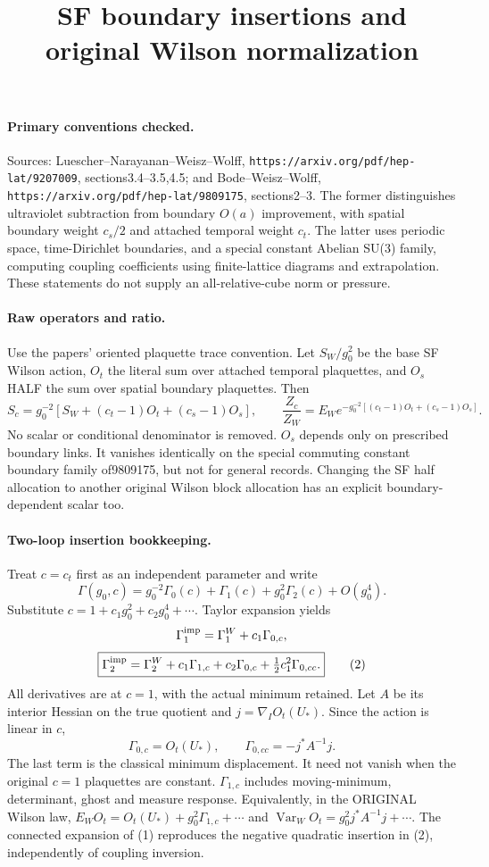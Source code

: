 \documentclass[11pt]{article}
\title{SF boundary insertions and original Wilson normalization}\author{}\date{}
\begin{document}
\maketitle
\paragraph{Primary conventions checked.}
Sources: Luescher--Narayanan--Weisz--Wolff,
\texttt{https://arxiv.org/pdf/hep-lat/9207009}, sections3.4--3.5,4.5;
and Bode--Weisz--Wolff,
\texttt{https://arxiv.org/pdf/hep-lat/9809175}, sections2--3.
The former distinguishes ultraviolet subtraction from boundary
$O(a)$ improvement, with spatial boundary weight $c_s/2$ and attached
temporal weight $c_t$. The latter uses periodic space, time-Dirichlet
boundaries, and a special constant Abelian SU(3) family, computing
coupling coefficients using finite-lattice diagrams and extrapolation.
These statements do not supply an all-relative-cube norm or pressure.

\paragraph{Raw operators and ratio.}
Use the papers' oriented plaquette trace convention. Let $S_W/g_0^2$
be the base SF Wilson action, $O_t$ the literal sum over attached
temporal plaquettes, and $O_s$ HALF the sum over spatial boundary
plaquettes. Then
\[
 S_c=g_0^{-2}[S_W+(c_t-1)O_t+(c_s-1)O_s],\qquad
 \frac{Z_c}{Z_W}=E_W e^{-g_0^{-2}[(c_t-1)O_t+(c_s-1)O_s]}. \tag{1}
\]
No scalar or conditional denominator is removed. $O_s$ depends only
on prescribed boundary links. It vanishes identically on the special
commuting constant boundary family of9809175, but not for general
records. Changing the SF half allocation to another original Wilson
block allocation has an explicit boundary-dependent scalar too.

\paragraph{Two-loop insertion bookkeeping.}
Treat $c=c_t$ first as an independent parameter and write
\[
 \Gamma(g_0,c)=g_0^{-2}\Gamma_0(c)+\Gamma_1(c)
                               +g_0^2\Gamma_2(c)+O(g_0^4).
\]
Substitute $c=1+c_1g_0^2+c_2g_0^4+\cdots$. Taylor expansion yields
\[
 \Gamma_1^{\rm imp}=\Gamma_1^W+c_1\Gamma_{0,c},
\]
\[
 \boxed{\Gamma_2^{\rm imp}=\Gamma_2^W+c_1\Gamma_{1,c}
       +c_2\Gamma_{0,c}+\tfrac12c_1^2\Gamma_{0,cc}.} \tag{2}
\]
All derivatives are at $c=1$, with the actual minimum retained.
Let $A$ be its interior Hessian on the true quotient and
$j=\nabla_I O_t(U_*)$. Since the action is linear in $c$,
\[
 \Gamma_{0,c}=O_t(U_*),\qquad \Gamma_{0,cc}=-j^*A^{-1}j. \tag{3}
\]
The last term is the classical minimum displacement. It need not
vanish when the original $c=1$ plaquettes are constant.
$\Gamma_{1,c}$ includes moving-minimum, determinant, ghost and measure
response. Equivalently, in the ORIGINAL Wilson law,
$E_WO_t=O_t(U_*)+g_0^2\Gamma_{1,c}+\cdots$ and
$\operatorname{Var}_WO_t=g_0^2j^*A^{-1}j+\cdots$.
The connected expansion of (1) reproduces the negative quadratic
insertion in (2), independently of coupling inversion.
\end{document}
